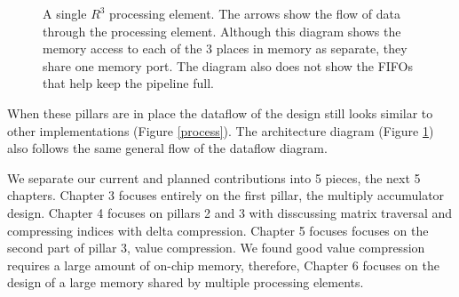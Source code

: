 \begin{figure}
\begin{tikzpicture}[scale=1]
\end{tikzpicture}
\caption{A single $R^3$ processing element. The arrows show the flow of data through the processing element. Although this diagram shows the memory access to each of the 3 places in memory as separate, they share one memory port. The diagram also does not show the FIFOs that help keep the pipeline full.}
\label{fig_SpMV}
\end{figure}%
%
When these pillars are in place the dataflow of the design still looks similar to other implementations (Figure \ref{process}). The architecture diagram (Figure \ref{fig_SpMV}) also follows the same general flow of the dataflow diagram.
\par We separate our current and planned contributions into 5 pieces, the next 5 chapters. Chapter 3 focuses entirely on the first pillar, the multiply accumulator design. Chapter 4 focuses on pillars 2 and 3 with disscussing matrix traversal and compressing indices with delta compression. Chapter 5 focuses focuses on the second part of pillar 3, value compression. We found good value compression requires a large amount of on-chip memory, therefore, Chapter 6 focuses on the design of a large memory shared by multiple processing elements.
